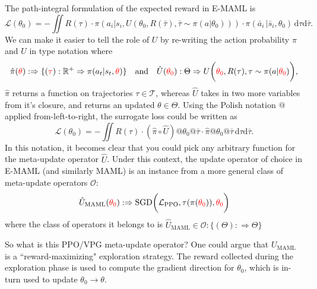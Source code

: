 \documentclass{article} %
\begin{document}
{The path-integral formulation of the expected reward in E-MAML is \begin{equation}
    \mathcal L(\theta_0) = - \iint R(\tau) 
    \cdot
    \pi (a_i \vert s_i, U(\theta_0, R(\bar\tau), \bar\tau\sim\pi(a\vert \theta_0))) 
    \cdot 
    \pi(\bar a_i\,\vert \bar s_i, \theta_0) \, \mathrm{d} \tau \mathrm d \bar \tau.
\end{equation} We can make it easier to tell the role of $U$ by re-writing the action probability $\pi$ and $U$ in type notation where \begin{equation}
\hat\pi( {\color{red}\theta} ) 
        :\Rightarrow \{
                ({\color{red}\tau}) :\mathbb R^+\Rightarrow \pi(a_t \vert s_t,  {\color{red}\theta} ) 
        \}
\hspace{1em}\text{and}\hspace{1em}
\hat U({\color{red}\theta_0}) :\Theta \Rightarrow U \bigg({\color{red}\theta_0}, R(\tau), \tau \sim \pi(a\vert{\color{red}\theta_0}) \bigg),
\end{equation}
$\hat\pi$ returns a function on trajectories $\tau \in \mathcal T$, whereas $\hat U$ takes in two more variables from it's closure, and returns an updated $\theta \in \Theta$. Using the Polish notation $@$ applied from-left-to-right, the surrogate loss could be written as
\begin{equation}
    \mathcal L(\theta_0) = - \iint R(\tau) 
    \cdot
    \left(\hat \pi \circ \hat U \right) @ \theta_0 @\bar\tau
    \cdot 
    \hat \pi @ \theta_0 @ \bar\tau \, \mathrm{d} \tau \mathrm d \bar \tau.
\end{equation} In this notation, it becomes clear that you could pick any arbitrary function for the meta-update operator $\hat U$. Under this context, the update operator of choice in E-MAML (and similarly MAML) is an instance from a more general class of meta-update operators $\mathcal O$: \begin{equation}
    \hat U_{\text{MAML}}({\color{red}\theta_0}) :\Rightarrow \text{SGD} \bigg(\mathcal L_{\text{PPO}}, \tau(\pi({\color{red}\theta_0})), {\color{red}\theta_0} \bigg) 
\end{equation} where the class of operators it belongs to is \( \hat U_{\text{MAML}} \in \mathcal O : \{ (\Theta) :\Rightarrow \Theta \} \)

So what is this PPO/VPG meta-update operator? One could argue that $U_{\text{MAML}}$ is a ``reward-maximizing" exploration strategy. The reward collected during the exploration phase is used to compute the gradient direction for $\theta_0$, which is in-turn used to update $\theta_0 \rightarrow \theta$.

}
\end{document}
